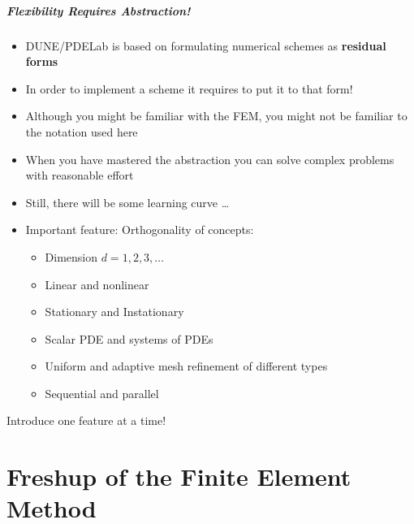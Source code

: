 \documentclass[aspectratio=169,11pt]{beamer}
\theoremstyle{definition}
\begin{document}
\begin{frame}
\frametitle{Flexibility Requires Abstraction!}
\begin{itemize}
\item DUNE/PDELab is based on formulating numerical schemes
as \textbf{residual forms}
\item In order to implement a scheme it requires to put it to that form!
\item Although you might be familiar with the FEM, you might not
be familiar to the notation used here
\item When you have mastered the abstraction you can solve complex problems with
reasonable effort
\item Still, there will be some learning curve \ldots
\item Important feature: Orthogonality of concepts:
\begin{itemize}
\item Dimension $d=1,2,3,\ldots$
\item Linear and nonlinear
\item Stationary and Instationary
\item Scalar PDE and systems of PDEs
\item Uniform and adaptive mesh refinement of different types
\item Sequential and parallel
\end{itemize}
\end{itemize}
\rightarrownice Introduce one feature at a time!
\end{frame}

\part{Freshup of the Finite Element Method}
\begin{frame}
  \partpage
\end{frame}

\end{document}
